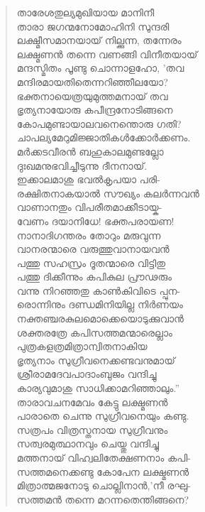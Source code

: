 \begin{verse}
താരേശതുല്യമുഖിയായ മാനിനീ\\
താരാ ജഗന്മനോമോഹിനി സുന്ദരി\\
ലക്ഷ്മീസമാനയായ് നില്ക്കുന്ന, തന്നേരം\\
ലക്ഷ്മണന്‍ തന്നെ വണങ്ങി വിനീതയായ്\\
മന്ദസ്മിതം പൂണ്ടു ചൊന്നാളഹോ, ’തവ\\
മന്ദിരമായതിതെന്നറിഞ്ഞീലയോ?\\
ഭക്തനായെത്രയുമുത്തമനായ് തവ\\
ഭൃത്യനായോരു കപീന്ദ്രനോടിങ്ങനെ\\
കോപമുണ്ടായാലവനെന്തൊരു ഗതി?\\
ചാപല്യമേറുമിജ്ജാതികള്‍ക്കോര്‍ക്കണം.\\
മര്‍ക്കടവീരന്‍ ബഹുകാലമുണ്ടല്ലോ\\
ദുഃഖമനുഭവിച്ചീടുന്നു ദീനനായ്.\\
ഇക്കാലമാശു ഭവല്‍കൃപയാ പരി-\\
രക്ഷിതനാകയാല്‍ സൗഖ്യം കലര്‍ന്നവന്‍\\
വാണാനതും വിപരീതമാക്കീടായ്ക-\\
വേണം ദയാനിധേ! ഭക്തപരായണ!\\
നാനാദിഗന്തരം തോറും മരുവുന്ന\\
വാനരന്മാരെ വരുത്തുവാനായവന്‍\\
പത്തു സഹസ്രം ദൂതന്മാരെ വിട്ടിതു\\
പത്തു ദിക്കീന്നും കപികുല പ്രൗഢരും\\
വന്നു നിറഞ്ഞതു കാണ്‍കിവിടെ പ്പുന-\\
രൊന്നിനും ദണ്ഡമിനിയില്ല നിര്‍ണയം\\
നക്തഞ്ചരകുലമൊക്കെയൊടുക്കുവാന്‍\\
ശക്തരത്രേ കപിസത്തമന്മാരെല്ലാം\\
പുത്രകളത്രമിത്രാന്വിതനാകിയ\\
ഭൃത്യനാം സുഗ്രീവനെക്കണ്ടവനുമായ്\\
ശ്രീരാമദേവപാദാംബുജം വന്ദിച്ചു\\
കാര്യവുമാശു സാധിക്കാമറിഞ്ഞാലും.”\\
താരാവചനമേവം കേട്ടു ലക്ഷ്മണന്‍\\
പാരാതെ ചെന്നു സുഗ്രീവനെയും കണ്ടു.\\
സത്രപം വിത്രസ്തനായ സുഗ്രീവനും\\
സത്വരമുത്ഥാനവും ചെയ്തു വന്ദിച്ചു\\
മത്തനായ് വിഹ്വലിതേക്ഷണനാം കപി-\\
സത്തമനെക്കണ്ടു കോപേന ലക്ഷ്മണന്‍\\
മിത്രാത്മജനോടു ചൊല്ലിനാന്‍,’നീ രഘു-\\
സത്തമന്‍ തന്നെ മറന്നതെന്തിങ്ങനെ?\\

\end{verse}
